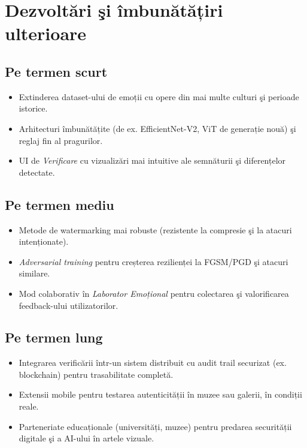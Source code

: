 \section{Dezvoltări şi îmbunătățiri ulterioare}
\subsection*{Pe termen scurt}
\begin{itemize}
  \item Extinderea dataset-ului de emoții cu opere din mai multe culturi şi perioade istorice.
  \item Arhitecturi îmbunătățite (de ex. EfficientNet-V2, ViT de generație nouă) şi reglaj fin al pragurilor.
  \item UI de \emph{Verificare} cu vizualizări mai intuitive ale semnăturii şi diferențelor detectate.
\end{itemize}

\subsection*{Pe termen mediu}
\begin{itemize}
  \item Metode de watermarking mai robuste (rezistente la compresie şi la atacuri intenționate).
  \item \emph{Adversarial training} pentru creșterea rezilienței la FGSM/PGD şi atacuri similare.
  \item Mod colaborativ în \emph{Laborator Emoțional} pentru colectarea şi valorificarea feedback-ului utilizatorilor.
\end{itemize}

\subsection*{Pe termen lung}
\begin{itemize}
  \item Integrarea verificării într-un sistem distribuit cu audit trail securizat (ex. blockchain) pentru trasabilitate completă.
  \item Extensii mobile pentru testarea autenticității în muzee sau galerii, în condiții reale.
  \item Parteneriate educaționale (universități, muzee) pentru predarea securității digitale şi a AI-ului în artele vizuale.
\end{itemize}

